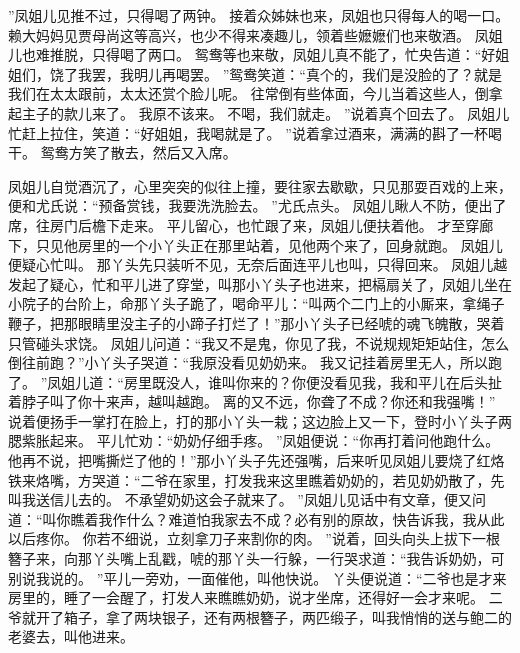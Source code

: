 ”凤姐儿见推不过，只得喝了两钟。
接着众姊妹也来，凤姐也只得每人的喝一口。
赖大妈妈见贾母尚这等高兴，也少不得来凑趣儿，领着些嬷嬷们也来敬酒。
凤姐儿也难推脱，只得喝了两口。
鸳鸯等也来敬，凤姐儿真不能了，忙央告道：“好姐姐们，饶了我罢，我明儿再喝罢。
”鸳鸯笑道：“真个的，我们是没脸的了？就是我们在太太跟前，太太还赏个脸儿呢。
往常倒有些体面，今儿当着这些人，倒拿起主子的款儿来了。
我原不该来。
不喝，我们就走。
”说着真个回去了。
凤姐儿忙赶上拉住，笑道：“好姐姐，我喝就是了。
”说着拿过酒来，满满的斟了一杯喝干。
鸳鸯方笑了散去，然后又入席。
\par
凤姐儿自觉酒沉了，心里突突的似往上撞，要往家去歇歇，只见那耍百戏的上来，便和尤氏说：“预备赏钱，我要洗洗脸去。
”尤氏点头。
凤姐儿瞅人不防，便出了席，往房门后檐下走来。
平儿留心，也忙跟了来，凤姐儿便扶着他。
才至穿廊下，只见他房里的一个小丫头正在那里站着，见他两个来了，回身就跑。
凤姐儿便疑心忙叫。
那丫头先只装听不见，无奈后面连平儿也叫，只得回来。
凤姐儿越发起了疑心，忙和平儿进了穿堂，叫那小丫头子也进来，把槅扇关了，凤姐儿坐在小院子的台阶上，命那丫头子跪了，喝命平儿：“叫两个二门上的小厮来，拿绳子鞭子，把那眼睛里没主子的小蹄子打烂了！”那小丫头子已经唬的魂飞魄散，哭着只管碰头求饶。
凤姐儿问道：“我又不是鬼，你见了我，不说规规矩矩站住，怎么倒往前跑？”小丫头子哭道：“我原没看见奶奶来。
我又记挂着房里无人，所以跑了。
”凤姐儿道：“房里既没人，谁叫你来的？你便没看见我，我和平儿在后头扯着脖子叫了你十来声，越叫越跑。
离的又不远，你聋了不成？你还和我强嘴！”
说着便扬手一掌打在脸上，打的那小丫头一栽；这边脸上又一下，登时小丫头子两腮紫胀起来。
平儿忙劝：“奶奶仔细手疼。
”凤姐便说：“你再打着问他跑什么。
他再不说，把嘴撕烂了他的！”那小丫头子先还强嘴，后来听见凤姐儿要烧了红烙铁来烙嘴，方哭道：“二爷在家里，打发我来这里瞧着奶奶的，若见奶奶散了，先叫我送信儿去的。
不承望奶奶这会子就来了。
”凤姐儿见话中有文章，便又问道：“叫你瞧着我作什么？难道怕我家去不成？必有别的原故，快告诉我，我从此以后疼你。
你若不细说，立刻拿刀子来割你的肉。
”说着，回头向头上拔下一根簪子来，向那丫头嘴上乱戳，唬的那丫头一行躲，一行哭求道：“我告诉奶奶，可别说我说的。
”平儿一旁劝，一面催他，叫他快说。
丫头便说道：“二爷也是才来房里的，睡了一会醒了，打发人来瞧瞧奶奶，说才坐席，还得好一会才来呢。
二爷就开了箱子，拿了两块银子，还有两根簪子，两匹缎子，叫我悄悄的送与鲍二的老婆去，叫他进来。
